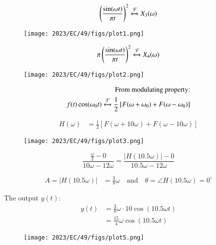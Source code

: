 \documentclass[journal,12pt,twocolumn]{IEEEtran}
\begin{document}
\begin{align}
\left(\frac{\sin(\omega t)}{\pi t}\right)^2  \xleftrightarrow{\mathcal{F}} X_3(\omega) 
\end{align}
\begin{figure}[h!]
    \centering
    \texttt{[image: 2023/EC/49/figs/plot1.png]}
    \caption{}
    \label{fig:sr11}
\end{figure}
\begin{align}
\pi\left(\frac{\sin(\omega t)}{\pi t}\right)^2 \xleftrightarrow{\mathcal{F}} X_4(\omega)
\end{align}
\begin{figure}[h!]
    \centering
    \texttt{[image: 2023/EC/49/figs/plot2.png]}
    \caption{}
    \label{fig:sr12}
\end{figure}
    \begin{align}
\text{From modulating property:} \nonumber \\
        f(t) \cos(\omega_0 t) \xleftrightarrow{\mathcal{F}} \frac{1}{2} \left[F(\omega + \omega_0) + F(\omega - \omega_0)\right]
    \end{align}

    \begin{align}
        H(\omega) &= \frac{1}{2} \left[F(\omega + 10\omega) + F(\omega - 10\omega)\right]
    \end{align}

\begin{figure}[h!]
    \centering
    \texttt{[image: 2023/EC/49/figs/plot3.png]}
    \caption{}
    \label{fig:sr13}
\end{figure}
\begin{equation}
    \frac{\frac{\omega}{2} - 0}{10\omega - 12\omega} = \frac{|H(10.5\omega)| - 0}{10.5\omega - 12\omega}
\end{equation}

\begin{align}
A = |H(10.5\omega)| &= \frac{3}{8}\omega \quad \text{and} \quad  \theta= \angle H(10.5\omega) = 0^\circ
\end{align}

The output \(y(t)\):
\begin{align}
y(t) &= \frac{3}{8}\omega \cdot 10 \cos(10.5 \omega t) \\
&= \frac{15}{4}\omega \cos(10.5 \omega t)
\end{align}
\begin{figure}[h!]
    \centering
    \texttt{[image: 2023/EC/49/figs/plot5.png]}
    \caption{}
    \label{fig:sr14}
\end{figure}
\end{document}
